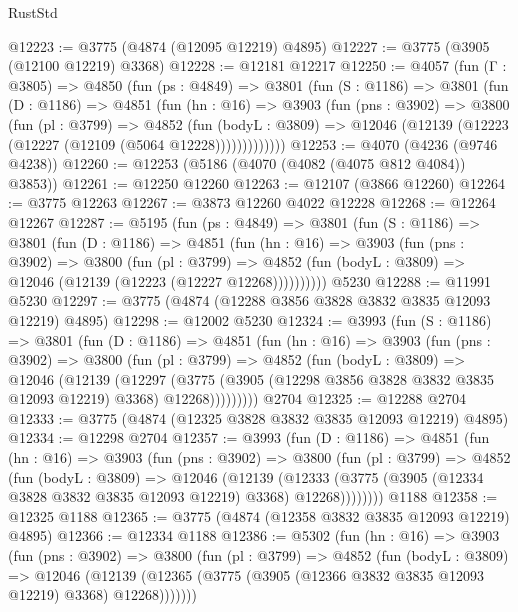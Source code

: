 \begin{lexlean}{RustStd}
\begin{coremodule}
{\begin{coremodule}
{{{{{{{{{{{{{{{{{{{{{{{{{{{{{{{@12223 := @3775 (@4874 (@12095 @12219) @4895)
@12227 := @3775 (@3905 (@12100 @12219) @3368)
@12228 := @12181 @12217
@12250 := @4057
    (fun (Γ : @3805) =>
    @4850
      (fun (ps : @4849) =>
      @3801
        (fun (S : @1186) =>
        @3801
          (fun (D : @1186) =>
          @4851
            (fun (hn : @16) =>
            @3903
              (fun (pns : @3902) =>
              @3800
                (fun (pl : @3799) =>
                @4852
                  (fun (bodyL : @3809) =>
                  @12046 (@12139 (@12223 (@12227 (@12109 (@5064 @12228)))))))))))))
@12253 := @4070 (@4236 (@9746 @4238))
@12260 := @12253 (@5186 (@4070 (@4082 (@4075 @812 @4084)) @3853))
@12261 := @12250 @12260
@12263 := @12107 (@3866 @12260)
@12264 := @3775 @12263
@12267 := @3873 @12260 @4022 @12228
@12268 := @12264 @12267
@12287 := @5195
    (fun (ps : @4849) =>
    @3801
      (fun (S : @1186) =>
      @3801
        (fun (D : @1186) =>
        @4851
          (fun (hn : @16) =>
          @3903
            (fun (pns : @3902) =>
            @3800
              (fun (pl : @3799) =>
              @4852 (fun (bodyL : @3809) => @12046 (@12139 (@12223 (@12227 @12268))))))))))
    @5230
@12288 := @11991 @5230
@12297 := @3775 (@4874 (@12288 @3856 @3828 @3832 @3835 @12093 @12219) @4895)
@12298 := @12002 @5230
@12324 := @3993
    (fun (S : @1186) =>
    @3801
      (fun (D : @1186) =>
      @4851
        (fun (hn : @16) =>
        @3903
          (fun (pns : @3902) =>
          @3800
            (fun (pl : @3799) =>
            @4852
              (fun (bodyL : @3809) =>
              @12046
                (@12139
                  (@12297
                    (@3775
                      (@3905 (@12298 @3856 @3828 @3832 @3835 @12093 @12219) @3368)
                      @12268)))))))))
    @2704
@12325 := @12288 @2704
@12333 := @3775 (@4874 (@12325 @3828 @3832 @3835 @12093 @12219) @4895)
@12334 := @12298 @2704
@12357 := @3993
    (fun (D : @1186) =>
    @4851
      (fun (hn : @16) =>
      @3903
        (fun (pns : @3902) =>
        @3800
          (fun (pl : @3799) =>
          @4852
            (fun (bodyL : @3809) =>
            @12046
              (@12139
                (@12333 (@3775 (@3905 (@12334 @3828 @3832 @3835 @12093 @12219) @3368) @12268))))))))
    @1188
@12358 := @12325 @1188
@12365 := @3775 (@4874 (@12358 @3832 @3835 @12093 @12219) @4895)
@12366 := @12334 @1188
@12386 := @5302
    (fun (hn : @16) =>
    @3903
      (fun (pns : @3902) =>
      @3800
        (fun (pl : @3799) =>
        @4852
          (fun (bodyL : @3809) =>
          @12046
            (@12139 (@12365 (@3775 (@3905 (@12366 @3832 @3835 @12093 @12219) @3368) @12268)))))))
}}}}}}}}}}}}}}}}}}}}}}}}}}}}}}}
\end{coremodule}}
\end{coremodule}
\end{lexlean}
